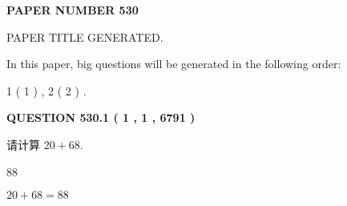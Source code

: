 \documentclass{ctexart}
\begin{document}
   
   
   
\newpage 
\setcounter{page}{ 
   530001 } 
   
   
   
   
 {\textbf{ \Large{ PAPER NUMBER  530  }}}
   
   
\vspace{0.2in}
   
   
   
   
   
   
   
   
 \vspace{0.2in}
 
 
 
 
   
   
 PAPER TITLE GENERATED.
   
   
   
\vspace{0.2in}
   
In this paper, big questions will be generated in the following order: 
   
   
   1 ( 1 )
 ,
   2 ( 2 )
 .
  
\vspace{0.2in}
  
{\textbf{\Large{QUESTION
530.1 
 ( 1 , 1 , 6791 )
}}}
  
  
 
请计算 $ %
20 +  %
68 $.
 
 
 
\noindent{}
 
 

88
 
 
\noindent{}
 
 

 
 
 
\noindent{}
 
 

$ %
20 +  %
68=   %
88$
 
 
\noindent{}
 
 

 
   
   
   
\end{document}
